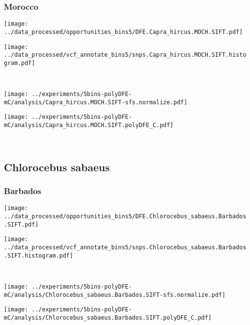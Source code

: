 \subsubsection{Morocco}

\begin{minipage}{0.49\linewidth}
    \texttt{[image: ../data\_processed/opportunities\_bins5/DFE.Capra\_hircus.MOCH.SIFT.pdf]}
\end{minipage}
\begin{minipage}{0.49\linewidth}
    \texttt{[image: ../data\_processed/vcf\_annotate\_bins5/snps.Capra\_hircus.MOCH.SIFT.histogram.pdf]}
\end{minipage}
\\
\begin{minipage}{0.49\linewidth}
    \texttt{[image: ../experiments/5bins-polyDFE-mC/analysis/Capra\_hircus.MOCH.SIFT-sfs.normalize.pdf]}
\end{minipage}
\begin{minipage}{0.49\linewidth}
    \texttt{[image: ../experiments/5bins-polyDFE-mC/analysis/Capra\_hircus.MOCH.SIFT.polyDFE\_C.pdf]}
\end{minipage}
\\

\subsection{Chlorocebus sabaeus}

\subsubsection{Barbados}

\begin{minipage}{0.49\linewidth}
    \texttt{[image: ../data\_processed/opportunities\_bins5/DFE.Chlorocebus\_sabaeus.Barbados.SIFT.pdf]}
\end{minipage}
\begin{minipage}{0.49\linewidth}
    \texttt{[image: ../data\_processed/vcf\_annotate\_bins5/snps.Chlorocebus\_sabaeus.Barbados.SIFT.histogram.pdf]}
\end{minipage}
\\
\begin{minipage}{0.49\linewidth}
    \texttt{[image: ../experiments/5bins-polyDFE-mC/analysis/Chlorocebus\_sabaeus.Barbados.SIFT-sfs.normalize.pdf]}
\end{minipage}
\begin{minipage}{0.49\linewidth}
    \texttt{[image: ../experiments/5bins-polyDFE-mC/analysis/Chlorocebus\_sabaeus.Barbados.SIFT.polyDFE\_C.pdf]}
\end{minipage}
\\

